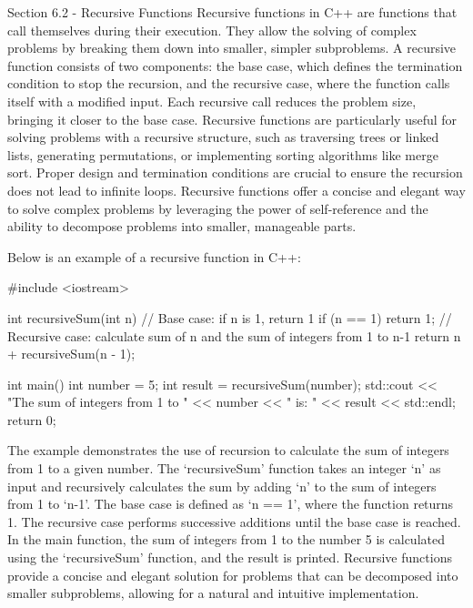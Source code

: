 \begin{notes}{Section 6.2 - Recursive Functions}
    Recursive functions in C++ are functions that call themselves during their execution. They allow the solving of complex problems by breaking them down into smaller, simpler subproblems. A recursive function consists of two components: the base case, which defines the 
    termination condition to stop the recursion, and the recursive case, where the function calls itself with a modified input. Each recursive call reduces the problem size, bringing it closer to the base case. Recursive functions are particularly useful for solving problems 
    with a recursive structure, such as traversing trees or linked lists, generating permutations, or implementing sorting algorithms like merge sort. Proper design and termination conditions are crucial to ensure the recursion does not lead to infinite loops. Recursive functions 
    offer a concise and elegant way to solve complex problems by leveraging the power of self-reference and the ability to decompose problems into smaller, manageable parts.
    
    \begin{highlight}
        Below is an example of a recursive function in C++:
    
    \begin{code}[C++]
    #include <iostream>

    int recursiveSum(int n) {
        // Base case: if n is 1, return 1
        if (n == 1) {
            return 1;
        }
        // Recursive case: calculate sum of n and the sum of integers from 1 to n-1
        return n + recursiveSum(n - 1);
    }
    
    int main() {
        int number = 5;
        int result = recursiveSum(number);
        std::cout << "The sum of integers from 1 to " << number 
        << " is: " << result << std::endl;
        return 0;
    }
    \end{code}
        The example demonstrates the use of recursion to calculate the sum of integers from 1 to a given number. The `recursiveSum' function takes an integer `n' as input and recursively calculates the sum by adding `n' to the sum of integers from 1 to `n-1'. The base case is defined 
        as `n == 1', where the function returns 1. The recursive case performs successive additions until the base case is reached. In the main function, the sum of integers from 1 to the number 5 is calculated using the `recursiveSum' function, and the result is printed. Recursive functions 
        provide a concise and elegant solution for problems that can be decomposed into smaller subproblems, allowing for a natural and intuitive implementation.
    \end{highlight}
\end{notes}

